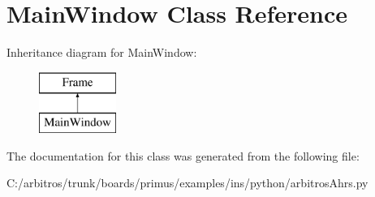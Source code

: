 \hypertarget{classarbitros_ahrs_1_1_main_window}{\section{Main\-Window Class Reference}
\label{classarbitros_ahrs_1_1_main_window}
}
Inheritance diagram for Main\-Window\-:\begin{figure}[H]
\begin{center}
\leavevmode
\includegraphics[height=2.000000cm]{classarbitros_ahrs_1_1_main_window}
\end{center}
\end{figure}


The documentation for this class was generated from the following file\-:\begin{DoxyCompactItemize}
\item 
C\-:/arbitros/trunk/boards/primus/examples/ins/python/arbitros\-Ahrs.\-py\end{DoxyCompactItemize}
